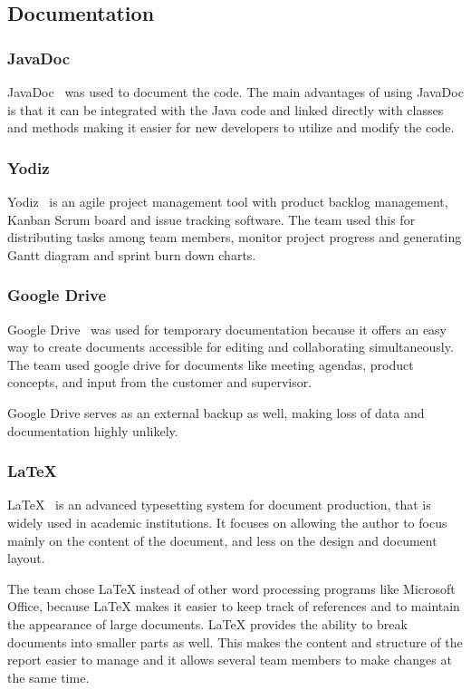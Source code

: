\subsection{Documentation}

\subsubsection{JavaDoc}
JavaDoc~\cite{javadoc} was used to document the code. The main advantages of using JavaDoc is that it can be integrated with the Java code and linked directly with classes and methods making it easier for new developers to utilize and modify the code.

\subsubsection{Yodiz}
Yodiz~\cite{yodiz} is an agile project management tool with product backlog management, Kanban Scrum board and issue tracking software. The team used this for distributing tasks among team members, monitor project progress and generating Gantt diagram and sprint burn down charts.

\subsubsection{Google Drive}
Google Drive~\cite{gdrive} was used for temporary documentation because it offers an easy way to create documents accessible for editing and collaborating simultaneously. The team used google drive for documents like meeting agendas, product concepts, and input from the customer and supervisor. 

Google Drive serves as an external backup as well, making loss of data and documentation highly unlikely.

\subsubsection{\LaTeX}
LaTeX~\cite{latex} is an advanced typesetting system for document production, that is widely used in
academic institutions. It focuses on allowing the author to focus mainly on the content of the document, and less on the design and document layout.

The team chose LaTeX instead of other word processing programs like Microsoft Office, because LaTeX makes it easier to keep track of references and to maintain the appearance of large documents. 
LaTeX provides the ability to break documents into smaller parts as well. This makes the content and structure of the report easier to manage and it allows several team members to make changes at the same time.

